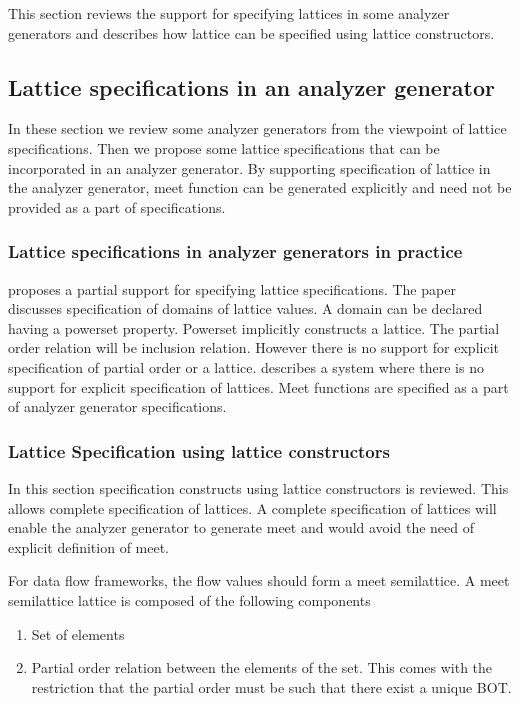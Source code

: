 \documentclass[12pt]{report}
\begin{document}
This section reviews the support for specifying lattices in some analyzer generators and describes how lattice can be specified using lattice constructors.

\subsection{Lattice specifications in an analyzer generator}
In these section we review some analyzer generators from the viewpoint of lattice specifications. Then we propose some lattice specifications that can be incorporated in an analyzer generator. By supporting specification of lattice in the analyzer generator, meet function can be generated explicitly and need not be provided as a part of specifications.

\subsubsection {Lattice specifications in analyzer generators in practice}

\cite{Yi} proposes a partial support for specifying lattice specifications. The paper discusses specification of domains of lattice values. A domain can be declared having a powerset property. Powerset implicitly constructs a lattice. The partial order relation will be inclusion relation. However there is no support for explicit specification of partial order or a lattice.
\cite{ldta} describes a system where there is no support for explicit specification of lattices. Meet functions are specified as a part of analyzer generator specifications.


\subsubsection{Lattice Specification using lattice constructors}
In this section specification constructs using lattice constructors \cite{netrareport} is reviewed. This allows complete specification of lattices. A complete specification of lattices will enable the analyzer generator to generate meet and would avoid the need of explicit definition of meet.

For data flow frameworks, the flow values should form a meet semilattice. A meet semilattice lattice is composed of the following components

\begin{enumerate}
\item Set of elements
\item Partial order relation between the elements of the set. This comes with the restriction that the partial order must be such that there exist a unique BOT.
\end{enumerate}
\end{document}
